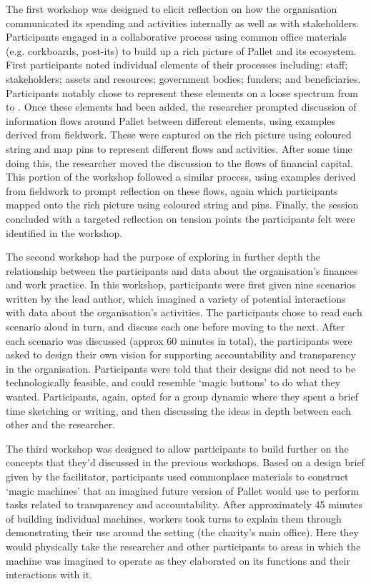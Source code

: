 The first workshop was designed to elicit reflection on how the organisation communicated its spending and activities internally as well as with stakeholders. Participants engaged in a collaborative process using common office materials (e.g. corkboards, post-its) to build up a rich picture \cite{monk_methods_1998} of Pallet and its ecosystem. First participants noted individual elements of their processes including: staff; stakeholders; assets and resources; government bodies; funders; and beneficiaries. Participants notably chose to represent these elements on a loose spectrum from  to . Once these elements had been added, the researcher prompted discussion of information flows around Pallet between different elements, using examples derived from fieldwork. These were captured on the rich picture using coloured string and map pins to represent different flows and activities. After some time doing this, the researcher moved the discussion to the flows of financial capital. This portion of the workshop followed a similar process, using examples derived from fieldwork to prompt reflection on these flows, again which participants mapped onto the rich picture using coloured string and pins. Finally, the session concluded with a targeted reflection on tension points the participants felt were identified in the workshop.

The second workshop had the purpose of exploring in further depth the relationship between the participants and data about the organisation's finances and work practice. In this workshop, participants were first given nine scenarios written by the lead author, which imagined a variety of potential interactions with data about the organisation's activities. The participants chose to read each scenario aloud in turn, and discuss each one before moving to the next. After each scenario was discussed (approx 60 minutes in total), the participants were asked to design their own vision for supporting accountability and transparency in the organisation. Participants were told that their designs did not need to be technologically feasible, and could resemble `magic buttons' to do what they wanted. Participants, again, opted for a group dynamic where they spent a brief time sketching or writing, and then discussing the ideas in depth between each other and the researcher.

The third workshop was designed to allow participants to build further on the concepts that they'd discussed in the previous workshops. Based on a design brief given by the facilitator, participants used commonplace materials to construct `magic machines' that an imagined future version of Pallet would use to perform tasks related to transparency and accountability. After approximately 45 minutes of building individual machines, workers took turns to explain them through demonstrating their use around the setting (the charity's main office). Here they would physically take the researcher and other participants to areas in which the machine was imagined to operate as they elaborated on its functions and their interactions with it.

